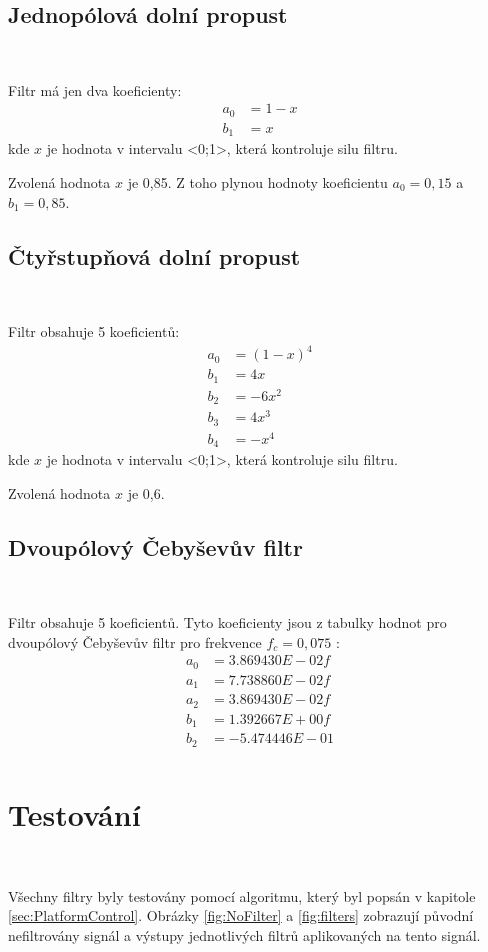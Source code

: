 \subsection{Jednopólová dolní propust}\

Filtr má jen dva koeficienty:
\begin{align}
a_0 &= 1 - x \\
b_1 &= x
\end{align}
kde $x$ je hodnota v intervalu <0;1>, která kontroluje silu filtru\cite{Filters}.

Zvolená hodnota $x$ je 0,85. Z toho plynou hodnoty koeficientu $a_0 = 0,15$ a $b_1 =
0,85$.

\subsection{Čtyřstupňová dolní propust}\

Filtr obsahuje 5 koeficientů:
\begin{align}
a_0 &= (1 - x)^4 \\
b_1 &= 4x \\
b_2 &= -6x^2 \\
b_3 &= 4x^3 \\
b_4 &= -x^4
\end{align}
kde $x$ je hodnota v intervalu <0;1>, která kontroluje silu filtru\cite{Filters}.

Zvolená hodnota $x$ je 0,6.

\subsection{Dvoupólový Čebyševův filtr}\

Filtr obsahuje 5 koeficientů. Tyto koeficienty jsou z tabulky hodnot pro dvoupólový
Čebyševův filtr pro frekvence $f_c = 0,075$ \cite{Filters}:
\begin{align}
a_0 &= 3.869430E-02f \\
a_1 &= 7.738860E-02f \\
a_2 &= 3.869430E-02f \\
b_1 &= 1.392667E+00f \\
b_2 &= -5.474446E-01 \\
\end{align}

\section{Testování}\

Všechny filtry byly testovány pomocí algoritmu, který byl popsán v kapitole
\ref{sec:PlatformControl}. Obrázky \ref{fig:NoFilter} a \ref{fig:filters} zobrazují
původní nefiltrovány signál a výstupy jednotlivých filtrů aplikovaných na tento
signál.

